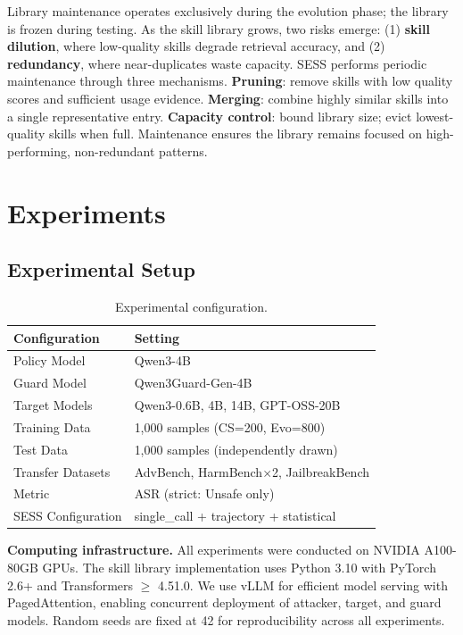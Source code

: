 \documentclass[letterpaper]{article}
\begin{document}
Library maintenance operates exclusively during the evolution phase; the library is frozen during testing. As the skill library grows, two risks emerge: (1) \textbf{skill dilution}, where low-quality skills degrade retrieval accuracy, and (2) \textbf{redundancy}, where near-duplicates waste capacity. SESS performs periodic maintenance through three mechanisms. \textbf{Pruning}: remove skills with low quality scores and sufficient usage evidence. \textbf{Merging}: combine highly similar skills into a single representative entry. \textbf{Capacity control}: bound library size; evict lowest-quality skills when full. Maintenance ensures the library remains focused on high-performing, non-redundant patterns.

\section{Experiments}

\subsection{Experimental Setup}

\begin{table}[t]
\centering
\caption{Experimental configuration.}
\label{tab:setup}
\small
\begin{tabular}{ll}
\toprule
\textbf{Configuration} & \textbf{Setting} \\
\midrule
Policy Model & Qwen3-4B \\
Guard Model & Qwen3Guard-Gen-4B \\
Target Models & Qwen3-0.6B, 4B, 14B, GPT-OSS-20B \\
Training Data & 1,000 samples (CS=200, Evo=800) \\
Test Data & 1,000 samples (independently drawn) \\
Transfer Datasets & AdvBench, HarmBench$\times$2, JailbreakBench \\
Metric & ASR (strict: Unsafe only) \\
SESS Configuration & single\_call + trajectory + statistical \\
\bottomrule
\end{tabular}
\end{table}

\textbf{Computing infrastructure.} All experiments were conducted on NVIDIA A100-80GB GPUs. The skill library implementation uses Python 3.10 with PyTorch 2.6+ and Transformers $\geq$ 4.51.0. We use vLLM for efficient model serving with PagedAttention, enabling concurrent deployment of attacker, target, and guard models. Random seeds are fixed at 42 for reproducibility across all experiments.
\end{document}

